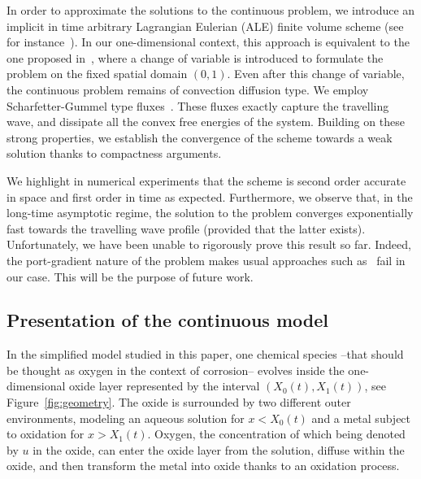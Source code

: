 \documentclass{amsart}
\begin{document}
In order to approximate the solutions to the continuous problem, we introduce an implicit in time arbitrary Lagrangian Eulerian (ALE) finite volume scheme (see for instance~\cite{ALE}). In our one-dimensional context, this approach is equivalent to the one proposed in~\cite{Calipso, CMZ18}, where a change of variable is introduced to formulate the problem on the fixed spatial domain $(0,1)$. 
Even after this change of variable, the continuous problem remains of convection diffusion type. We employ Scharfetter-Gummel type fluxes~\cite{ScharfGumm, Il'in69, Chatard_FVCA6}. These fluxes exactly capture the travelling wave, and dissipate all the convex free energies of the system. Building on these strong properties, we 
establish the convergence of the scheme towards a weak solution thanks to compactness arguments. 

We highlight in numerical experiments that the scheme is second order accurate in space and first order in time as expected. Furthermore, we observe that, in the long-time asymptotic regime, the solution to the problem converges exponentially fast towards the travelling wave profile (provided that the latter exists). Unfortunately, we have been unable to rigorously prove this result so far. Indeed, the port-gradient nature of the problem makes usual approaches such as~\cite{GajewGrog, GlitzGrogHunl, AMTU01, Glitz1, Glitz2, BC14} fail in our case. 
This will be the purpose of future work.


\subsection{Presentation of the continuous model}
	
	
In the simplified model studied in this paper, one chemical species --that should be thought as oxygen in the context of corrosion-- evolves inside the one-dimensional oxide layer represented by the interval $(X_0(t), X_1(t))$, see Figure~\ref{fig:geometry}. The oxide is surrounded by two different outer environments, modeling 
an aqueous solution for $x < X_0(t)$ and a metal subject to oxidation for $x>X_1(t)$.
Oxygen, the concentration of which being denoted by $u$ in the oxide, can enter the oxide layer from the solution, diffuse within the oxide, and 
then transform the metal into oxide thanks to an oxidation process. 
\end{document}
